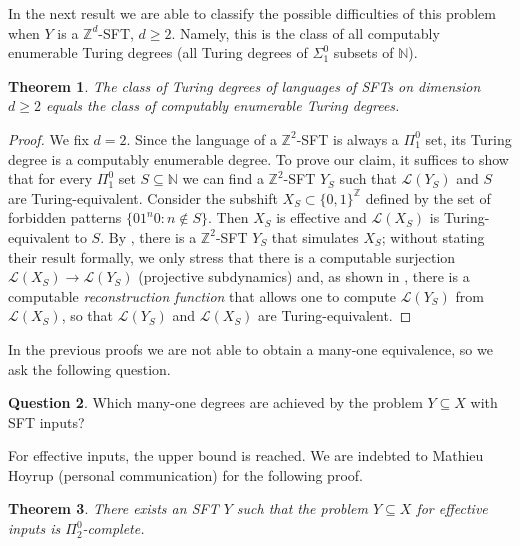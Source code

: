 \documentclass[a4paper]{article}
\newcommand{\Le}{\mathcal{L}}
\newcommand{\Z}{\mathbb{Z}}
\newcommand{\N}{\mathbb{N}}
\newtheorem{theorem}{Theorem}[section]
\theoremstyle{definition}
\newtheorem{question}[theorem]{Question}
\begin{document}
In the next result we are able to classify the possible difficulties of this problem when $Y$ is a $\Z^d$-SFT, $d\geq 2$. Namely, this is the class of all computably enumerable Turing degrees (all Turing degrees of $\Sigma_1^0$ subsets of $\N$). 
\begin{theorem}\label{prop:alldegree}
The class of Turing degrees of languages of SFTs on dimension $d\geq 2$ equals the class of computably enumerable Turing degrees.
\end{theorem}
\begin{proof}
We fix $d=2$. Since the language of a $\Z^2$-SFT is always a $\Pi_1^0$ set, its Turing degree is a computably enumerable degree. To prove our claim, it suffices to show that for every $\Pi_1^0$ set $S\subseteq \N$ we can find a $\Z^2$-SFT $Y_S$ such that $\Le(Y_S)$ and $S$ are Turing-equivalent. Consider the subshift $X_S\subset\{0,1\}^\Z$ defined by the set of forbidden patterns $\{01^n0 : n\notin S\}$. Then $X_S$  is effective and $\Le(X_S)$ is Turing-equivalent to $S$. By \cite{aubrun2013simulation}, there is a $\Z^2$-SFT $Y_S$ that simulates $X_S$; without stating their result formally, we only stress that there is a computable surjection $\Le(X_S) \to \Le(Y_S)$ (projective subdynamics) and, as shown in \cite[Section 5]{barbieri2024zero}, there is a computable \emph{reconstruction function} that allows one to compute $\Le(Y_S)$ from $\Le(X_S)$, so that $\Le(Y_S)$ and $\Le(X_S)$ are Turing-equivalent.
\end{proof}

In the previous proofs we are not able to obtain a many-one equivalence, so we ask the following question.
\begin{question}
    Which many-one degrees are achieved by the problem $Y\subseteq X$ with SFT inputs?
\end{question}

For effective inputs, the upper bound is reached.
We are indebted to Mathieu Hoyrup (personal communication) for the following proof.

\begin{theorem}\label{thm:upper-bound-incl}
    There exists an SFT $Y$ such that the problem $Y\subseteq X$ for effective inputs is $\Pi^0_2$-complete.
\end{theorem}
\end{document}
